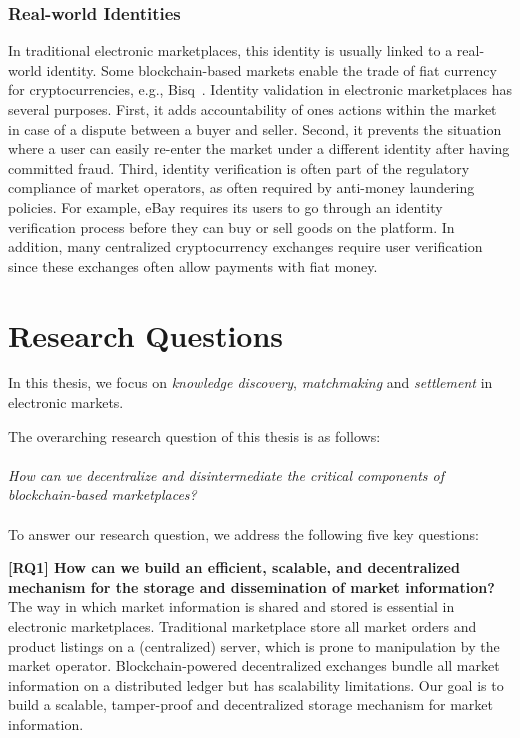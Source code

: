\subsubsection{Real-world Identities}
In traditional electronic marketplaces, this identity is usually linked to a real-world identity.
Some blockchain-based markets enable the trade of fiat currency for cryptocurrencies, e.g., Bisq~\cite{bisq}.
Identity validation in electronic marketplaces has several purposes.
First, it adds accountability of ones actions within the market in case of a dispute between a buyer and seller.
Second, it prevents the situation where a user can easily re-enter the market under a different identity after having committed fraud.
Third, identity verification is often part of the regulatory compliance of market operators, as often required by anti-money laundering policies.
For example, eBay requires its users to go through an identity verification process before they can buy or sell goods on the platform.
In addition, many centralized cryptocurrency exchanges require user verification since these exchanges often allow payments with fiat money.

\section{Research Questions}
\label{sec:research_questions}
In this thesis, we focus on \emph{knowledge discovery}, \emph{matchmaking} and \emph{settlement} in electronic markets.

The overarching research question of this thesis is as follows:\\\\
\emph{How can we decentralize and disintermediate the critical components of blockchain-based marketplaces?}\\\\
To answer our research question, we address the following five key questions:

\textbf{[RQ1] How can we build an efficient, scalable, and decentralized mechanism for the storage and dissemination of market information?}
The way in which market information is shared and stored is essential in electronic marketplaces.
Traditional marketplace store all market orders and product listings on a (centralized) server, which is prone to manipulation by the market operator.
Blockchain-powered decentralized exchanges bundle all market information on a distributed ledger but has scalability limitations.
Our goal is to build a scalable, tamper-proof and decentralized storage mechanism for market information.

